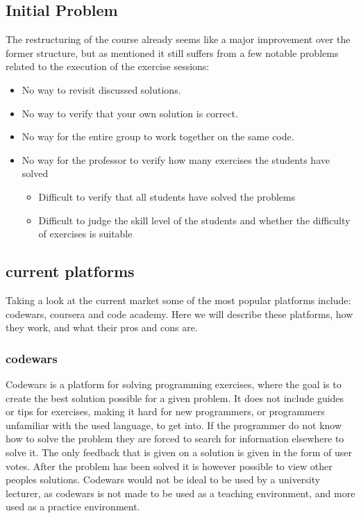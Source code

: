 \subsection{Initial Problem} \label{sec:initial-problem}
The restructuring of the course already seems like a major improvement over the former structure, but as mentioned it still suffers from a few notable problems related to the execution of the exercise sessions:
\begin{itemize}
	\item No way to revisit discussed solutions.
	\item No way to verify that your own solution is correct.
	\item No way for the entire group to work together on the same code.
	\item No way for the professor to verify how many exercises the students have solved
	\begin{itemize}
		\item Difficult to verify that all students have solved the problems
		\item Difficult to judge the skill level of the students and whether the difficulty of exercises is suitable
	\end{itemize}
\end{itemize}

\subsection{current platforms}
Taking a look at the current market some of the most popular platforms include: codewars, coursera and code academy.
Here we will describe these platforms, how they work, and what their pros and cons are.

\subsubsection*{codewars}
Codewars is a platform for solving programming exercises, where the goal is to create the best solution possible for a given problem. It does not include guides or tips for exercises, making it hard for new programmers, or programmers unfamiliar with the used language, to get into. If the programmer do not know how to solve the problem they are forced to search for information elsewhere to solve it. The only feedback that is given on a solution is given in the form of user votes. After the problem has been solved it is however possible to view other peoples solutions. 
Codewars would not be ideal to be used by a university lecturer, as codewars is not made to be used as a teaching environment, and more used as a practice environment.

